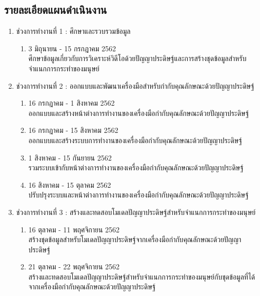 \subsection*{รายละเอียดแผนดำเนินงาน}
\begin{enumerate}\setlength\itemsep{-0.25em}
	\item ช่วงการทำงานที่ 1 : ศึกษาและรวบรวมข้อมูล
		\begin{enumerate}
			\item 3 มิถุนายน - 15 กรกฎาคม 2562\\ศึกษาข้อมูลเกี่ยวกับการวิเคราะห์วิดีโอด้วยปัญญาประดิษฐ์และการสร้างชุดข้อมูลสำหรับจำแนกการกระทำของมนุษย์		
		\end{enumerate}	
	\item ช่วงการทำงานที่ 2 : ออกแบบและพัฒนาเครื่องมือสำหรับกำกับคุณลักษณะด้วยปัญญาประดิษฐ์
		\begin{enumerate}
			\item 16 กรกฎาคม - 1 สิงหาคม 2562\\ออกแบบและสร้างหน้าต่างการทำงานของเครื่องมือกำกับคุณลักษณะด้วยปัญญาประดิษฐ์
			\item 16 กรกฎาคม - 15 สิงหาคม 2562\\ออกแบบและสร้างระบบการทำงานของเครื่องมือกำกับคุณลักษณะด้วยปัญญาประดิษฐ์
			\item 1 สิงหาคม - 15 กันยายน 2562\\รวมระบบเข้ากับหน้าต่างการทำงานของเครื่องมือกำกับคุณลักษณะด้วยปัญญาประดิษฐ์
			\item 16 สิงหาคม - 15 ตุลาคม 2562\\ปรับปรุงระบบและหน้าต่างการทำงานของเครื่องมือกำกับคุณลักษณะด้วยปัญญาประดิษฐ์
		\end{enumerate}
	\item ช่วงการทำงานที่ 3 : สร้างและทดสอบโมเดลปัญญาประดิษฐ์สำหรับจำแนกการกระทำของมนุษย์
		\begin{enumerate}
			\item 16 ตุลาคม - 11 พฤศจิกายน 2562\\สร้างชุดข้อมูลสำหรับโมเดลปัญญาประดิษฐ์จากเครื่องมือกำกับคุณลักษณะด้วยปัญญาประดิษฐ์
			\item 21 ตุลาคม - 22 พฤศจิกายน 2562\\สร้างและทดสอบโมเดลปัญญาประดิษฐ์สำหรับจำแนกการกระทำของมนุษย์กับชุดข้อมูลที่ได้จากเครื่องมือกำกับคุณลักษณะด้วยปัญญาประดิษฐ์		
		\end{enumerate}	
\end{enumerate}
\clearpage